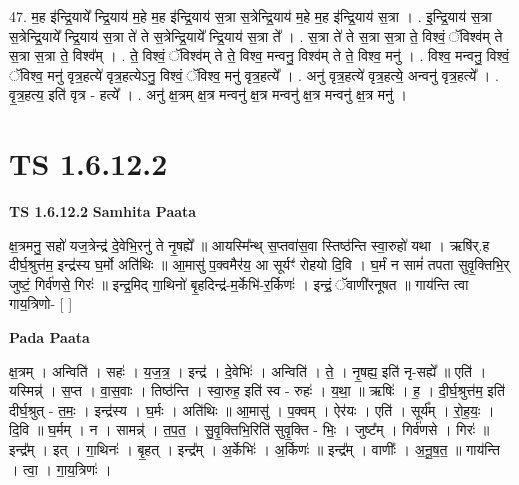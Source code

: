 \documentclass[17pt]{extarticle}
\begin{document}
47. म॒ह इ॑न्द्रि॒याये᳚ न्द्रि॒याय॑ म॒हे म॒ह इ॑न्द्रि॒याय॑ स॒त्रा स॒त्रेन्द्रि॒याय॑ म॒हे म॒ह इ॑न्द्रि॒याय॑ स॒त्रा । . इ॒न्द्रि॒याय॑ स॒त्रा स॒त्रेन्द्रि॒याये᳚ न्द्रि॒याय॑ स॒त्रा ते॑ ते स॒त्रेन्द्रि॒याये᳚ न्द्रि॒याय॑ स॒त्रा ते᳚ । . स॒त्रा ते॑ ते स॒त्रा स॒त्रा ते॒ विश्वं॒ ॅविश्व॑म् ते स॒त्रा स॒त्रा ते॒ विश्व᳚म् । . ते॒ विश्वं॒ ॅविश्व॑म् ते ते॒ विश्व॒ मन्वनु॒ विश्व॑म् ते ते॒ विश्व॒ मनु॑ । . विश्व॒ मन्वनु॒ विश्वं॒ ॅविश्व॒ मनु॑ वृत्र॒हत्ये॑ वृत्र॒हत्येऽनु॒ विश्वं॒ ॅविश्व॒ मनु॑ वृत्र॒हत्ये᳚ । . अनु॑ वृत्र॒हत्ये॑ वृत्र॒हत्ये॒ अन्वनु॑ वृत्र॒हत्ये᳚ । . वृ॒त्र॒हत्य॒ इति॑ वृत्र - हत्ये᳚ । . अनु॑ क्ष॒त्रम् क्ष॒त्र मन्वनु॑ क्ष॒त्र मन्वनु॑ क्ष॒त्र मन्वनु॑ क्ष॒त्र मनु॑ । \newline
\pagebreak
{}

\section{ TS 1.6.12.2 }

\textbf{TS 1.6.12.2 } \newline
\textbf{Samhita Paata} \newline

क्ष॒त्रमनु॒ सहो॑ यज॒त्रेन्द्र॑ दे॒वेभि॒रनु॑ ते नृ॒षह्ये᳚ ॥ आयस्मि᳚न्थ् स॒प्तवा॑स॒वा स्तिष्ठ॑न्ति स्वा॒रुहो॑ यथा । ऋषि॑र्.ह दीर्घ॒श्रुत्त॑म॒ इन्द्र॑स्य घ॒र्मो अति॑थिः ॥ आ॒मासु॑ प॒क्वमैर॑य॒ आ सूर्यꣳ॑ रोहयो दि॒वि । घ॒र्मं न सामं॑ तपता सुवृ॒क्तिभि॒र् जुष्टं॒ गिर्व॑णसे॒ गिरः॑ ॥ इन्द्र॒मिद् गा॒थिनो॑ बृ॒हदिन्द्र॑-म॒र्केभि॑-र॒र्किणः॑ । इन्द्रं॒ ॅवाणी॑रनूषत ॥ गाय॑न्ति त्वा गाय॒त्रिणो- [ ] \newline

\textbf{Pada Paata} \newline

क्ष॒त्रम् । अन्विति॑ । सहः॑ । य॒ज॒त्र॒ । इन्द्र॑ । दे॒वेभिः॑ । अन्विति॑ । ते॒ । नृ॒षह्य॒ इति॑ नृ-सह्ये᳚ ॥ एति॑ । यस्मिन्न्॑ । स॒प्त । वा॒स॒वाः । तिष्ठ॑न्ति । स्वा॒रुह॒ इति॑ स्व - रुहः॑ । य॒था॒ ॥ ऋषिः॑ । ह॒ । दी॒र्घ॒श्रुत्त॑म॒ इति॑ दीर्घ॒श्रुत् - त॒मः॒ । इन्द्र॑स्य । घ॒र्मः । अति॑थिः ॥ आ॒मासु॑ । प॒क्वम् । ऐर॑यः । एति॑ । सूर्य᳚म् । रो॒ह॒यः॒ । दि॒वि ॥ घ॒र्मम् । न । सामन्न्॑ । त॒प॒त॒ । सु॒वृ॒क्तिभि॒रिति॑ सुवृ॒क्ति - भिः॒ । जुष्ट᳚म् । गिर्व॑णसे । गिरः॑ ॥ इन्द्र᳚म् । इत् । गा॒थिनः॑ । बृ॒हत् । इन्द्र᳚म् । अ॒र्केभिः॑ । अ॒र्किणः॑ ॥ इन्द्र᳚म् । वाणीः᳚ । अ॒नू॒ष॒त॒ ॥ गाय॑न्ति । त्वा॒ । गा॒य॒त्रिणः॑ ।  \newline
\end{document}
